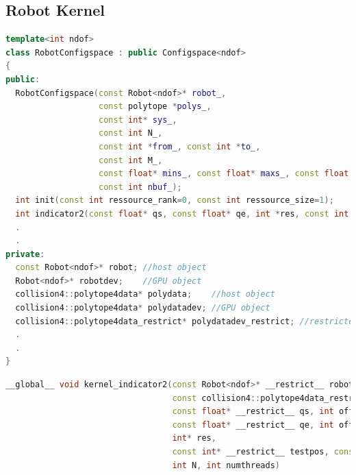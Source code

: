 \documentclass[twocolumn]{svjour3}
\begin{document}

\subsection{Robot Kernel}

\footnotesize
\begin{lstlisting}[language=C++, frame=single, float=*,
	caption=Robot configuration space class structure.,
	label=code4
]
template<int ndof>
class RobotConfigspace : public Configspace<ndof>
{
public:
  RobotConfigspace(const Robot<ndof>* robot_,
                   const polytope *polys_,
                   const int* sys_,
                   const int N_,
                   const int *from_, const int *to_,
                   const int M_,
                   const float* mins_, const float* maxs_, const float dq_,
                   const int nbuf_);
  int init(const int ressource_rank=0, const int ressource_size=1);
  int indicator2(const float* qs, const float* qe, int *res, const int N, const int offset);
  .
  .
private:
  const Robot<ndof>* robot; //host object
  Robot<ndof>* robotdev;    //GPU object
  collision4::polytope4data* polydata;    //host object
  collision4::polytope4data* polydatadev; //GPU object
  collision4::polytope4data_restrict* polydatadev_restrict; //restricted pointers collection
  .
  .
}
\end{lstlisting}
\normalsize


\footnotesize
\begin{lstlisting}[language=C++, frame=single, float=*,
	caption=GPU collision kernel for testing robot configurations.,
	label=code5
]
__global__ void kernel_indicator2(const Robot<ndof>* __restrict__ robot,
                                  const collision4::polytope4data_restrict polydata,
                                  const float* __restrict__ qs, int offsets,
                                  const float* __restrict__ qe, int offsete,
                                  int* res,
                                  const int* __restrict__ testpos, const int* __restrict__ testnum,
                                  int N, int numthreads)
\end{lstlisting}
\normalsize
\end{document}

